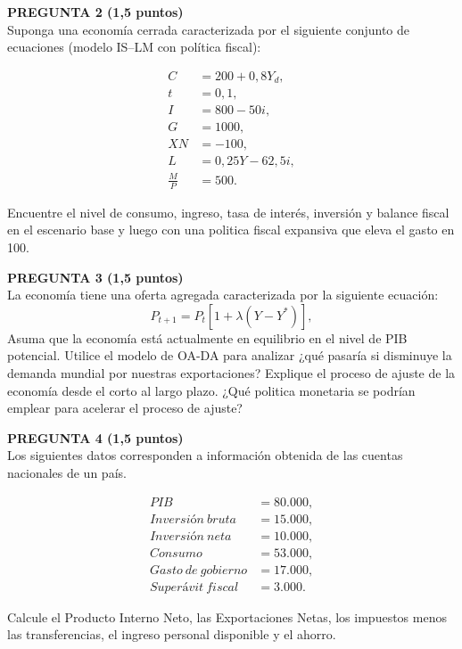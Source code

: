 \documentclass[11pt,addpoints]{article}
\begin{document}
\textbf{PREGUNTA 2 (1,5 puntos)}\\[0.2cm]
Suponga una economía cerrada caracterizada por el siguiente conjunto de ecuaciones (modelo IS–LM con política fiscal):

\begin{align*}
C &= 200 + 0{,}8Y_d, \\
t &= 0{,}1, \\
I &= 800 - 50i, \\
G &= 1000, \\
XN &= -100, \\
L &= 0{,}25Y - 62{,}5i, \\
\frac{M}{P} &= 500.
\end{align*}

Encuentre el nivel de consumo, ingreso, tasa de interés, inversión y balance fiscal en el escenario base y luego con una politica fiscal expansiva que eleva el gasto en 100.

\vspace{0.4cm}

\textbf{PREGUNTA 3 (1,5 puntos)}\\[0.2cm]
La economía tiene una oferta agregada caracterizada por la siguiente ecuación:
\[
P_{t+1} = P_{t}\left[1 + \lambda (Y - Y^*)\right],
\]
Asuma que la economía está actualmente en equilibrio en el nivel de PIB potencial. Utilice el modelo de OA-DA para analizar ¿qué pasaría si disminuye la demanda mundial por nuestras exportaciones? Explique el proceso de ajuste de la economía desde el corto al largo plazo. ¿Qué politica monetaria se podrían emplear para acelerar el proceso de ajuste?

\newpage
\vspace*{0.5cm}
\textbf{PREGUNTA 4 (1,5 puntos)}\\[0.2cm]
Los siguientes datos corresponden a información obtenida de las cuentas nacionales de un país.

\begin{align*}
PIB &= 80{.}000, \\
Inversión\ bruta &= 15{.}000, \\
Inversión\ neta &= 10{.}000, \\
Consumo &= 53{.}000, \\
Gasto\ de\ gobierno &= 17{.}000, \\
Superávit\ fiscal &= 3{.}000.
\end{align*}

Calcule el Producto Interno Neto, las Exportaciones Netas, los impuestos menos las transferencias, el ingreso personal disponible y el ahorro.
\end{document}
